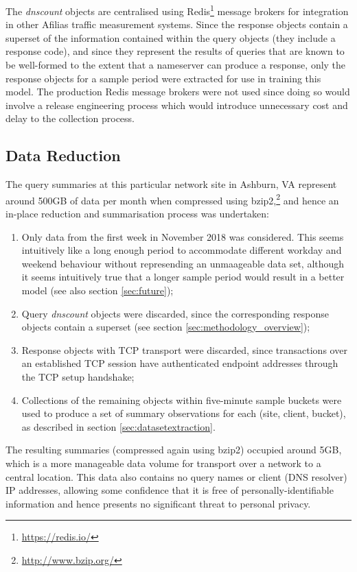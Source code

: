 \documentclass[conference]{IEEEtran}
\let\tightlist\relax %
\begin{document}
The \emph{dnscount} objects are centralised using
Redis\footnote{\url{https://redis.io/}} message brokers for integration
in other Afilias traffic measurement systems. Since the response objects
contain a superset of the information contained within the query objects
(they include a response code), and since they represent the results of
queries that are known to be well-formed to the extent that a nameserver
can produce a response, only the response objects for a sample period
were extracted for use in training this model. The production Redis
message brokers were not used since doing so would involve a release
engineering process which would introduce unnecessary cost and delay to
the collection process.

\subsection{Data Reduction}\label{sec:data-reduction}

The query summaries at this particular network site in Ashburn, VA
represent around 500GB of data per month when compressed using
bzip2,\footnote{\url{http://www.bzip.org/}} and hence an in-place
reduction and summarisation process was undertaken:

\begin{enumerate}
\def\labelenumi{\arabic{enumi}.}
\tightlist
\item
  Only data from the first week in November 2018 was considered. This
  seems intuitively like a long enough period to accommodate different
  workday and weekend behaviour without represending an unmaageable data
  set, although it seems intuitively true that a longer sample period
  would result in a better model (see also section \ref{sec:future});
\item
  Query \emph{dnscount} objects were discarded, since the corresponding
  response objects contain a superset (see section
  \ref{sec:methodology_overview});
\item
  Response objects with TCP transport were discarded, since transactions
  over an established TCP session have authenticated endpoint addresses
  through the TCP setup handshake;
\item
  Collections of the remaining objects within five-minute sample buckets
  were used to produce a set of summary observations for each (site,
  client, bucket), as described in section \ref{sec:datasetextraction}.
\end{enumerate}

The resulting summaries (compressed again using bzip2) occupied around
5GB, which is a more manageable data volume for transport over a network
to a central location. This data also contains no query names or client
(DNS resolver) IP addresses, allowing some confidence that it is free of
personally-identifiable information and hence presents no significant
threat to personal privacy.
\end{document}
